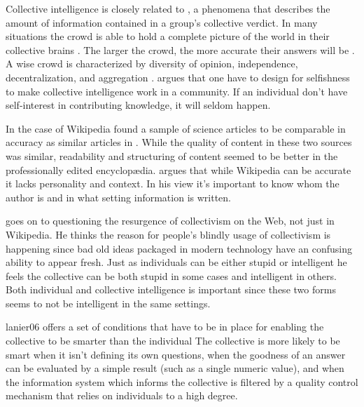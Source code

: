 Collective intelligence is closely related to
, a phenomena that describes the amount of information
contained in a group's collective verdict.
In many situations the crowd is able to hold a complete picture of the world
in their collective brains \citep[]{surowiecki04}. The larger the
crowd, the more accurate their answers will be%
.
A wise crowd is characterized by diversity of opinion, independence,
decentralization, and aggregation \citep[]{surowiecki04}.
\citet{powazek08} argues that one have to design for selfishness to make
collective intelligence work in a community. If an individual don't have
self-interest in contributing knowledge, it will seldom happen.

In the case of Wikipedia \citet{giles05} found a sample of science articles to
be comparable in accuracy as similar articles in
. While the quality of content in
these two sources was similar, readability and structuring of content seemed
to be better in the professionally edited encyclop\ae{}dia.
\citet{lanier06} argues that while Wikipedia can be accurate it lacks
personality and context. In his view it's important to know whom the author is
and in what setting information is written.

\citet{lanier06} goes on to questioning the resurgence of collectivism on the
Web, not just in Wikipedia.
He thinks the reason for people's blindly usage of collectivism is happening
since bad old ideas packaged in modern technology have an confusing ability to
appear fresh. Just as individuals can be either
stupid or intelligent he feels the collective can be both stupid in some cases
and intelligent in others. Both individual and collective intelligence is
important since these two forms seems to not be intelligent in the same
settings.

\begin{fullquote}{lanier06}{%
  offers a set of conditions that have to be in place for enabling the
  collective to be smarter than the individual}
    The collective is more likely to be smart when it isn't defining its own
    questions, when the goodness of an answer can be evaluated by a simple
    result (such as a single numeric value), and when the information system
    which informs the collective is filtered by a quality control mechanism
    that relies on individuals to a high degree.
\end{fullquote}

